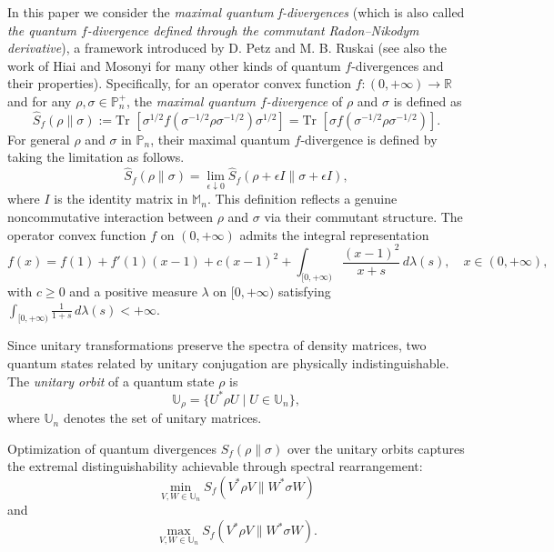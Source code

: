 \documentclass[10pt,reqno]{amsart}
\theoremstyle{break-italic}
\theoremstyle{break-italic}
\theoremstyle{break-italic}
\theoremstyle{break-italic}
\theoremstyle{break-italic}
\theoremstyle{break-italic}
\theoremstyle{break-italic}
\theoremstyle{break-italic}
\theoremstyle{break-roman}
\theoremstyle{standard}
\theoremstyle{varthm-roman}
\theoremstyle{varthm-italic}
\theoremstyle{varthm-roman-break}
\theoremstyle{varthm-italic-break}
\theoremstyle{varthm-roman-no-punctuation}
\theoremstyle{varthm-italic-no-punctuation}
\numberwithin{equation}{section}
\def\Tr{\text{Tr }}
\begin{document}
In this paper we consider the \textit{ maximal quantum f-divergences} (which is also called \textit{the quantum $f$-divergence defined through the commutant Radon–Nikodym derivative}), a framework introduced by D. Petz and M. B. Ruskai \cite{PeRus98} (see also the work of Hiai and Mosonyi \cite{Hiai2017} for many other kinds of quantum $f$-divergences and their properties). Specifically, for an operator convex function $f : (0, +\infty) \rightarrow  \mathbb R$ and for any $\rho, \sigma \in \mathbb P_n^+$, the \textit{maximal quantum $f$-divergence } of $\rho$ and $\sigma$ is defined as 
\begin{equation}
\widehat{S}_f(\rho\|\sigma):=\Tr\left[\sigma^{1/2}f(\sigma^{-1/2}\rho\sigma^{-1/2})\sigma^{1/2}\right]=\Tr\left[\sigma f\left(\sigma^{-1/2}\rho\sigma^{-1/2}\right)\right].
\end{equation}
For general $\rho$ and $\sigma$ in $\mathbb P_n$, their maximal quantum $f$-divergence is defined by taking the limitation as follows.
\begin{equation}  \label{def-maximal-đivergence-general}
\widehat{S}_f(\rho\|\sigma) = \lim_{\epsilon \downarrow 0} \widehat{S}_f(\rho+\epsilon I\|\sigma+\epsilon I),
\end{equation}
where $I$ is the identity matrix in $\mathbb M_n$. 
This definition reflects a genuine noncommutative interaction between $\rho$ and $\sigma$ via their commutant structure. The operator convex function $f$ on $(0, +\infty)$ admits the integral representation
\begin{equation}\label{opt-convex-int-rep}
f(x) = f(1) + f'(1)(x-1) + c(x-1)^2 + \!\int_{[0,+\infty)} \!\! \frac{(x-1)^2}{x+s}\,d\lambda(s), \quad x \in (0, +\infty),
\end{equation}
with $c\geq 0$ and a positive measure $\lambda$ on $[0, +\infty)$ satisfying $\!\int_{[0,+\infty)} \!\! \frac{1}{1+s}\,d\lambda(s)< +\infty$. 


Since unitary transformations preserve the spectra of density matrices, two quantum states related by unitary conjugation are physically indistinguishable. The \emph{unitary orbit} of a quantum state $\rho$ is
\begin{equation}
\mathbb{U}_\rho = \{U^*\rho U \mid U \in \mathbb{U}_n\},
\end{equation}
where $\mathbb U_n$ denotes the set of unitary matrices.

 Optimization of quantum divergences $S_f(\rho\|\sigma)$ over the unitary orbits captures the extremal distinguishability achievable through spectral rearrangement:
\begin{equation} 
  \min_{V, W\in \mathbb U_n}S_f(V^*\rho V\|W^*\sigma W) 
\end{equation}
and 
\begin{equation}
 \max_{V, W\in \mathbb U_n} S_f(V^*\rho V\| W^*\sigma W).
\end{equation}
\end{document}
